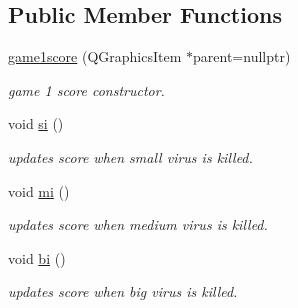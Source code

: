 \subsection*{Public Member Functions}
\begin{DoxyCompactItemize}
\item 
\hyperlink{classgame1score_ab80521983d8a77a466dd7d7253fcd647}{game1score} (Q\+Graphics\+Item $\ast$parent=nullptr)
\begin{DoxyCompactList}\small\item\em game 1 score constructor. \end{DoxyCompactList}\item 
void \hyperlink{classgame1score_a8e7db583a40c885711eae334d4c695cd}{si} ()
\begin{DoxyCompactList}\small\item\em updates score when small virus is killed. \end{DoxyCompactList}\item 
void \hyperlink{classgame1score_a7b29421704c3766a8535fa878b3036d9}{mi} ()
\begin{DoxyCompactList}\small\item\em updates score when medium virus is killed. \end{DoxyCompactList}\item 
void \hyperlink{classgame1score_aa2aecd005fd86671e508a3b91f4251b6}{bi} ()
\begin{DoxyCompactList}\small\item\em updates score when big virus is killed. \end{DoxyCompactList}\end{DoxyCompactItemize}
